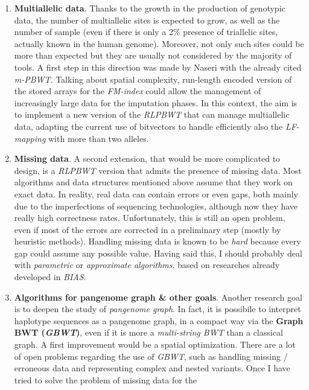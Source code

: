 \documentclass[a4paper,11pt, oneside]{article}
\begin{document}
\begin{enumerate}[leftmargin=.2in]
  \setlength\itemsep{-0.2em}
  \item \textbf{Multiallelic data}. Thanks to the growth in the
  production of genotypic data, the number of multiallelic sites is expected to
  grow, as well as the number of sample (even if there is only a 2\% presence of
  triallelic sites, actually known in the human genome). Moreover, not only
  such sites could be more than expected but they are 
  usually not considered by the majority of tools. A first step in this
  direction was made 
  by Naseri with the already cited \textit{m-PBWT}.
  Talking about spatial complexity, run-length encoded version of the stored
  arrays for the \textit{FM-index} could allow the management of increasingly
  large data for the imputation phases.   
  In this context, the aim is to implement a new 
  version of the \textit{RLPBWT} that can manage multiallelic data, adapting the
  current use of bitvectors to handle efficiently also the \textit{LF-mapping}
  with more than two alleles. 
  \item \textbf{Missing data}. A second extension, that would be more
  complicated to 
  design, is a \textit{RLPBWT} version that admits the presence of
  missing data. Most algorithms and data structures mentioned above assume that
  they work on exact data. In reality, real data can contain errors or even
  gaps, both mainly due to the imperfections of sequencing technologies,
  although now they have really high correctness rates. Unfortunately, this is
  still an open problem, even if most of the errors are corrected in a
  preliminary step (mostly by heuristic methods).
  Handling missing data is known to be \textit{hard} because every gap could
  assume any possible value. Having said this, I should  
  probably deal with \textit{parametric} or \textit{approximate algorithms},
  based on researches already developed in \textit{BIAS}.
  \item \textbf{Algorithms for pangenome graph \& other goals}. Another research
  goal is to deepen 
  the study of \textit{pangenome graph}. In fact, it is possibile to interpret
  haplotype sequences as a 
  pangenome graph, in a compact way via the \textbf{Graph BWT (\textit{GBWT})},
  even if it is more a \textit{multi-string BWT} than a classical graph. A first
  improvement would be a spatial optimization. There are a lot of open problems 
  regarding the use of \textit{GBWT}, such as handling missing / erroneous data
  and representing complex and nested 
  variants. Once I have tried to solve the problem of missing data for the

\end{enumerate}
\end{document}
